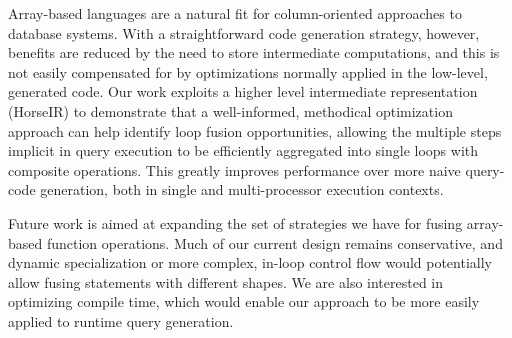 Array-based languages are a natural fit for column-oriented approaches to database systems.  With a straightforward code generation strategy, however, benefits are reduced by the need to store intermediate computations, and this is not easily compensated for by optimizations normally applied in the low-level, generated code.  Our work exploits a higher level intermediate representation (HorseIR) to demonstrate that a well-informed, methodical optimization approach can help identify loop fusion opportunities, allowing the multiple steps implicit in query execution to be efficiently aggregated into single loops with composite operations.  This greatly improves performance over more naive query-code generation, both in single and multi-processor execution contexts.

Future work is aimed at expanding the set of strategies we have for fusing array-based function operations.  Much of our current design remains conservative, and dynamic specialization or more complex, in-loop control flow would potentially allow fusing statements with different shapes.  We are also interested in optimizing compile time, which would enable our approach to be more easily applied to runtime query generation.
